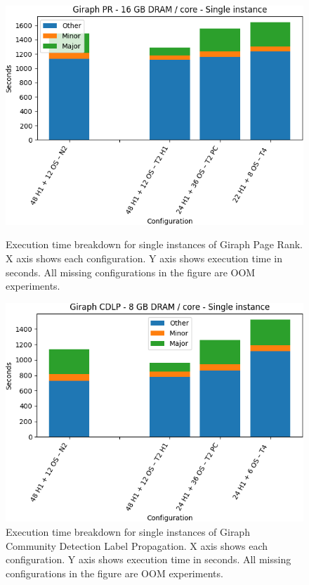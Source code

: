 \begin{figure}[thbp]
        \centering
    \includegraphics[width=\linewidth]{./fig/g_pr128_single.png}
    \caption{Execution time breakdown for single instances of Giraph
    Page Rank. X axis shows each configuration.
Y axis shows execution time in seconds. All missing configurations in the figure are OOM experiments.}
    \label{fig:g_pr128_single}
    \includegraphics[width=\linewidth]{./fig/g_cdlp128_single.png}
    \caption{Execution time breakdown for single instances of Giraph
    Community Detection Label Propagation. X axis shows each configuration.
Y axis shows execution time in seconds. All missing configurations in the figure are OOM experiments.}
    \label{fig:g_cdlp128_single}
\end{figure}

